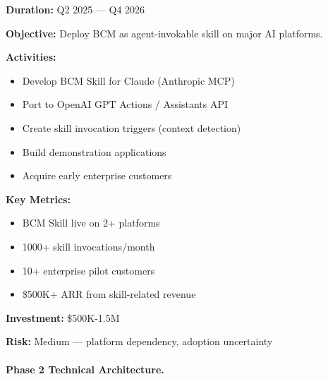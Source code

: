 \begin{tcolorbox}[colback=purple!5!white, colframe=purple!75!black,
    title=Phase 2: BCM as Skill]

\textbf{Duration:} Q2 2025 --- Q4 2026

\textbf{Objective:}
Deploy BCM as agent-invokable skill on major AI platforms.

\textbf{Activities:}
\begin{itemize}[nosep]
\item Develop BCM Skill for Claude (Anthropic MCP)
\item Port to OpenAI GPT Actions / Assistants API
\item Create skill invocation triggers (context detection)
\item Build demonstration applications
\item Acquire early enterprise customers
\end{itemize}

\textbf{Key Metrics:}
\begin{itemize}[nosep]
\item BCM Skill live on 2+ platforms
\item 1000+ skill invocations/month
\item 10+ enterprise pilot customers
\item \$500K+ ARR from skill-related revenue
\end{itemize}

\textbf{Investment:} \$500K-1.5M

\textbf{Risk:} Medium --- platform dependency, adoption uncertainty

\end{tcolorbox}

\paragraph{Phase 2 Technical Architecture.}


